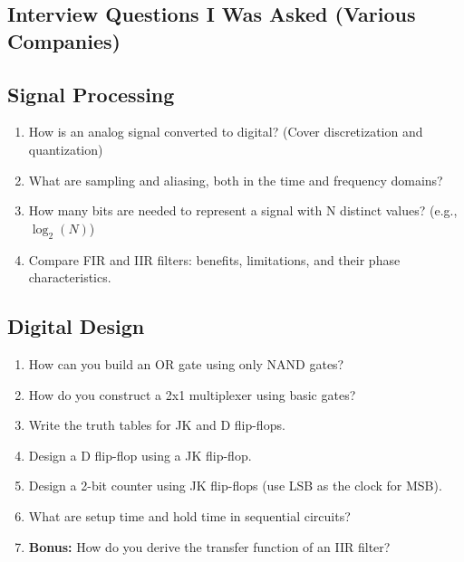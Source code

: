 \subsection*{Interview Questions I Was Asked (Various Companies)}

\subsection*{Signal Processing}
\begin{enumerate}
    \item How is an analog signal converted to digital? (Cover discretization and quantization)
    \item What are sampling and aliasing, both in the time and frequency domains?
    \item How many bits are needed to represent a signal with N distinct values? (e.g., $\log_2(N)$)
    \item Compare FIR and IIR filters: benefits, limitations, and their phase characteristics.
\end{enumerate}

\subsection*{Digital Design}
\begin{enumerate}
    \item How can you build an OR gate using only NAND gates?
    \item How do you construct a 2x1 multiplexer using basic gates?
    \item Write the truth tables for JK and D flip-flops.
    \item Design a D flip-flop using a JK flip-flop.
    \item Design a 2-bit counter using JK flip-flops (use LSB as the clock for MSB).
    \item What are setup time and hold time in sequential circuits?
    \item \textbf{Bonus:} How do you derive the transfer function of an IIR filter?
\end{enumerate}

